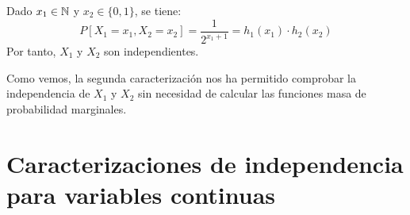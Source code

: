 \begin{ejemplo}
\begin{description}
        Dado $x_1\in \mathbb{N}$ y $x_2\in \{0,1\}$, se tiene:
        \begin{equation*}
            P[X_1=x_1,X_2=x_2]=\dfrac{1}{2^{x_1+1}}=h_1(x_1)\cdot h_2(x_2)
        \end{equation*}
        Por tanto, $X_1$ y $X_2$ son independientes.
    \end{description}

    Como vemos, la segunda caracterización nos ha permitido comprobar la independencia de $X_1$ y $X_2$ sin necesidad de calcular las funciones masa de probabilidad marginales. 
\end{ejemplo}


\section{Caracterizaciones de independencia para variables continuas}

